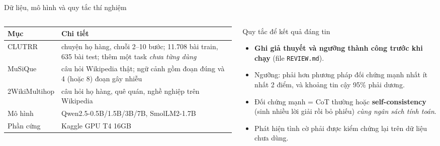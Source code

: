 \documentclass[aspectratio=169,t]{beamer}
\newcommand{\code}[1]{\texttt{#1}}
\begin{document}
\begin{frame}[shrink]{Dữ liệu, mô hình và quy tắc thí nghiệm}
\begin{columns}[T,onlytextwidth]
\scriptsize
\renewcommand{\arraystretch}{1.18}
\begin{tabularx}{\linewidth}{@{}P{1.9cm}Y@{}}
\toprule
\textbf{Mục} & \textbf{Chi tiết}\\
\midrule
CLUTRR & chuyện họ hàng, chuỗi 2--10 bước; 11.708 bài train, 635 bài test; thêm một task \emph{chưa từng dùng}\\
MuSiQue & câu hỏi Wikipedia thật; ngữ cảnh gồm đoạn đúng và 4 (hoặc 8) đoạn gây nhiễu\\
2WikiMultihop & câu hỏi họ hàng, quê quán, nghề nghiệp trên Wikipedia\\
Mô hình & Qwen2.5-0.5B/1.5B/3B/7B, SmolLM2-1.7B\\
Phần cứng & Kaggle GPU T4 16GB\\
\bottomrule
\end{tabularx}
\begin{block}{Quy tắc để kết quả đáng tin}
\scriptsize
\begin{itemize}
  \setlength{\itemsep}{2pt}
  \item \textbf{Ghi giả thuyết và ngưỡng thành công trước khi chạy} (file \code{REVIEW.md}).
  \item Ngưỡng: phải hơn phương pháp đối chứng mạnh nhất ít nhất 2 điểm, và khoảng tin cậy 95\% phải dương.
  \item Đối chứng mạnh = CoT thường hoặc \textbf{self-consistency} (sinh nhiều lời giải rồi bỏ phiếu) \emph{cùng ngân sách tính toán}.
  \item Phát hiện tình cờ phải được kiểm chứng lại trên dữ liệu chưa dùng.
\end{itemize}
\end{block}
\end{columns}
\par\kern0pt
\end{frame}
\end{document}
